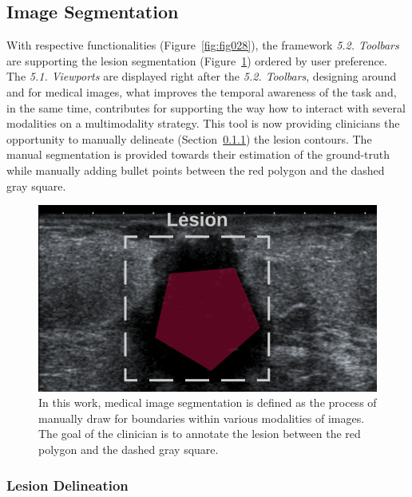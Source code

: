 \subsection{Image Segmentation}
\label{sec:sec004003002}

With respective functionalities (Figure~\ref{fig:fig028}), the framework {\it 5.2. Toolbars} are supporting the lesion segmentation (Figure~\ref{fig:fig004}) ordered by user preference.
The {\it 5.1. Viewports} are displayed right after the {\it 5.2. Toolbars}, designing around and for medical images, what improves the temporal awareness of the task and, in the same time, contributes for supporting the way how to interact with several modalities on a multimodality strategy.
This tool is now providing clinicians the opportunity to manually delineate (Section~\ref{sec:sec004003002001}) the lesion contours.
The manual segmentation is provided towards their estimation of the ground-truth while manually adding bullet points between the red polygon and the dashed gray square.

\begin{figure}[ht]
\centering
\includegraphics[width=\textwidth]{images/fig004}
\caption{In this work, medical image segmentation is defined as the process of manually draw for boundaries within various modalities of images. The goal of the clinician is to annotate the lesion between the red polygon and the dashed gray square.}
\label{fig:fig004}
\end{figure}

\subsubsection{Lesion Delineation}
\label{sec:sec004003002001}

